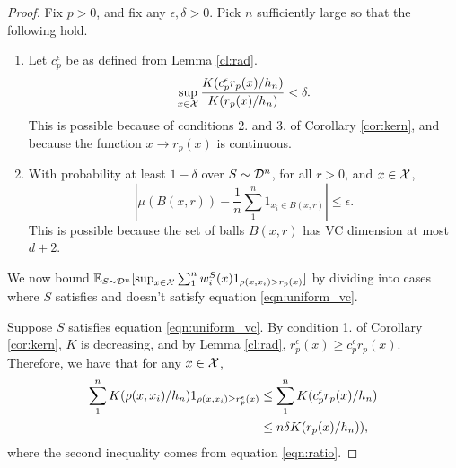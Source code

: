 \begin{proof}
Fix $p > 0$, and fix any $\epsilon, \delta > 0$. Pick $n$ sufficiently large so that the following hold.
\begin{enumerate}
	\item Let $c_p^\epsilon$ be as defined from Lemma \ref{cl:rad}. \begin{equation}\label{eqn:ratio}\sup_{x \in \mathcal X} \frac{K(c_p^\epsilon r_p(x)/h_n)}{K(r_p(x) / h_n)} < \delta.\end{equation} This is possible because of conditions 2. and 3. of Corollary \ref{cor:kern}, and because the function $x \to r_p(x)$ is continuous.
	\item With probability at least $1 - \delta$ over $S \sim {\mathcal D}^n$, for all $r > 0$, and $x \in \mathcal X$, \begin{equation}\label{eqn:uniform_vc}|\mu(B(x,r)) - \frac{1}{n}\sum_1^n 1_{x_i \in B(x, r)}| \leq \epsilon.\end{equation} This is possible because the set of balls $B(x,r)$ has VC dimension at most $d+2$.
\end{enumerate}
We now bound $\mathbb{E}_{S \sim {\mathcal D}^n}[ \sup_{x \in \mathcal X} \sum_1^n w_i^S(x)1_{\rho(x, x_i) > r_p(x)}]$ by dividing into cases where $S$ satisfies and doesn't satisfy equation \ref{eqn:uniform_vc}. 

Suppose $S$ satisfies equation \ref{eqn:uniform_vc}. By condition 1. of Corollary \ref{cor:kern}, $K$ is decreasing, and by Lemma \ref{cl:rad}, $r_p^\epsilon(x) \geq c_p^\epsilon r_p(x)$. Therefore, we have that for any $x \in \mathcal X$,
\begin{equation*}
\begin{split}
\sum_1^n K(\rho(x, x_i)/h_n)1_{\rho(x, x_i) \geq r_p^\epsilon(x)} &\leq \sum_1^n K(c_p^\epsilon r_p(x)/h_n)\\
&\leq n\delta K(r_p(x)/h_n)),
\end{split}
\end{equation*}
where the second inequality comes from equation \ref{eqn:ratio}. 


\end{proof}
